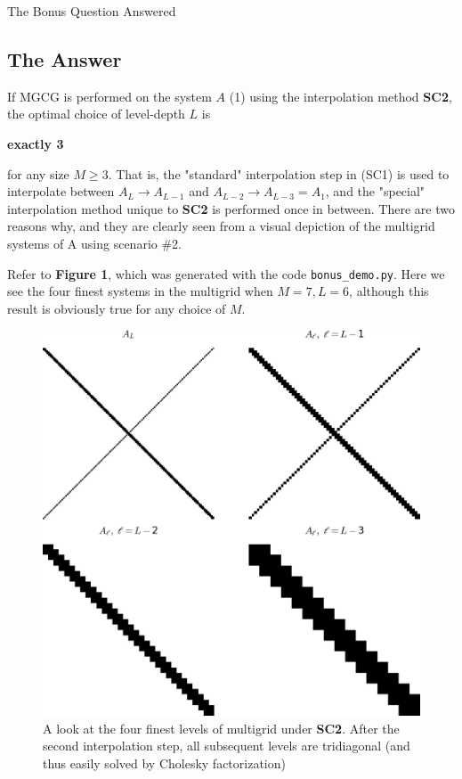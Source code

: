 \documentclass[10pt]{article}
\theoremstyle{definition}
\begin{document}
\clearpage
\begin{section}{The Bonus Question Answered}
\subsection{The Answer}
If MGCG is performed on the system $A$ (1) using the interpolation method \textbf{SC2}, the optimal choice of level-depth $L$ is \begin{huge}\textbf{exactly 3}\end{huge} for any size $M\ge3$. That is, the "standard" interpolation step in (SC1) is used to interpolate between $A_L \rightarrow A_{L-1}$ and $A_{L-2}\rightarrow A_{L-3} = A_{1}$, and the "special" interpolation method unique to \textbf{SC2} is performed once in between. There are two reasons why, and they are clearly seen from a visual depiction of the multigrid systems of A using scenario \#2.

Refer to \textbf{Figure 1}, which was generated with the code \texttt{bonus\_demo.py}. Here we see the four finest systems in the multigrid when $M=7, L=6$, although this result is obviously true for any choice of $M$.
\begin{figure}[p]
\begin{center}
\includegraphics[width=0.8\linewidth]{scenario2_spy.png}
\caption{A look at the four finest levels of multigrid under \textbf{SC2}. After the second interpolation step, all subsequent levels are tridiagonal (and thus easily solved by Cholesky factorization)}
\end{center}
\end{figure}


\end{section}
\end{document}
